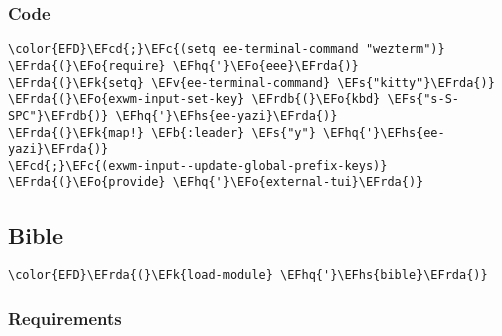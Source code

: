 \documentclass[a4wide,10pt]{article}
\newcommand{\EFc}[1]{\textcolor{EFc}{#1}} %
\newcommand{\EFcd}[1]{\textcolor{EFcd}{#1}} %
\newcommand{\EFs}[1]{\textcolor{EFs}{#1}} %
\newcommand{\EFk}[1]{\textcolor{EFk}{#1}} %
\newcommand{\EFb}[1]{\textcolor{EFb}{#1}} %
\newcommand{\EFv}[1]{\textcolor{EFv}{#1}} %
\newcommand{\EFo}[1]{\textcolor{EFo}{#1}} %
\newcommand{\EFhq}[1]{\textcolor{EFhq}{#1}} %
\newcommand{\EFhs}[1]{\textcolor{EFhs}{#1}} %
\newcommand{\EFrda}[1]{\textcolor{EFrda}{#1}} %
\newcommand{\EFrdb}[1]{\textcolor{EFrdb}{#1}} %
\begin{document}
\subsubsection{Code}
\label{sec:org12c594f}
\begin{Code}
\begin{Verbatim}
\color{EFD}\EFcd{;}\EFc{(setq ee-terminal-command "wezterm")}
\EFrda{(}\EFo{require} \EFhq{'}\EFo{eee}\EFrda{)}
\EFrda{(}\EFk{setq} \EFv{ee-terminal-command} \EFs{"kitty"}\EFrda{)}
\EFrda{(}\EFo{exwm-input-set-key} \EFrdb{(}\EFo{kbd} \EFs{"s-S-SPC"}\EFrdb{)} \EFhq{'}\EFhs{ee-yazi}\EFrda{)}
\EFrda{(}\EFk{map!} \EFb{:leader} \EFs{"y"} \EFhq{'}\EFhs{ee-yazi}\EFrda{)}
\EFcd{;}\EFc{(exwm-input--update-global-prefix-keys)}
\EFrda{(}\EFo{provide} \EFhq{'}\EFo{external-tui}\EFrda{)}
\end{Verbatim}
\end{Code}
\subsection{Bible}
\label{sec:org0b78451}
\begin{Code}
\begin{Verbatim}
\color{EFD}\EFrda{(}\EFk{load-module} \EFhq{'}\EFhs{bible}\EFrda{)}
\end{Verbatim}
\end{Code}
\subsubsection{Requirements}
\label{sec:org8b201ea}
\end{document}
